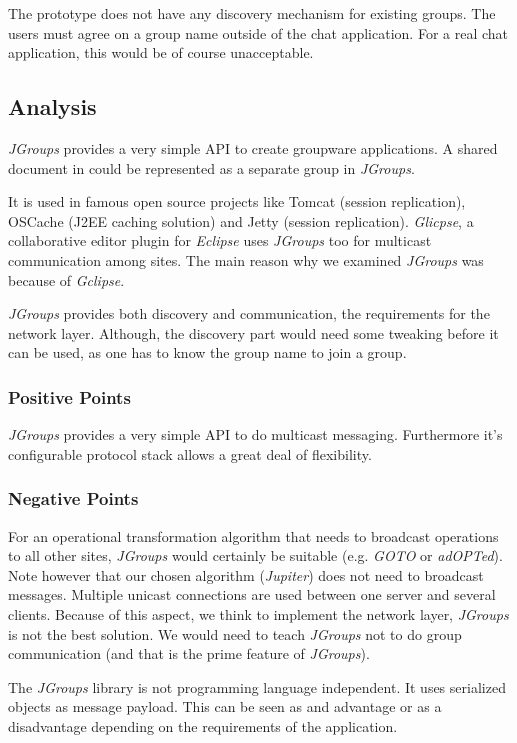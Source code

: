 The prototype does not have any discovery mechanism for existing groups. The users must agree on a group name outside of the chat application. For a real chat application, this would be of course unacceptable.


\subsection{Analysis}
\emph{JGroups} provides a very simple API to create groupware applications. A shared document in \ace could be represented as a separate group in \emph{JGroups}. 

It is used in famous open source projects like Tomcat (session replication), OSCache (J2EE caching solution) and Jetty (session replication). \emph{Glicpse}, a collaborative editor plugin for \emph{Eclipse} uses \emph{JGroups} too for multicast communication among sites. The main reason why we examined \emph{JGroups} was because of \emph{Gclipse}.

\emph{JGroups} provides both discovery and communication, the requirements for the network layer. Although, the discovery part would need some tweaking before it can be used, as one has to know the group name to join a group.

\subsubsection{Positive Points}
\emph{JGroups} provides a very simple API to do multicast messaging. Furthermore it's configurable protocol stack allows a great deal of flexibility.

\subsubsection{Negative Points}
For an operational transformation algorithm that needs to broadcast operations to all other sites, \emph{JGroups} would certainly be suitable (e.g. \emph{GOTO}  or \emph{adOPTed}). Note however that our chosen algorithm (\emph{Jupiter}) does not need to broadcast messages. Multiple unicast connections are used between one server and several clients. Because of this aspect, we think to implement the network layer, \emph{JGroups} is not the best solution. We would need to teach \emph{JGroups} not to do group communication (and that is the prime feature of \emph{JGroups}). 

The \emph{JGroups} library is not programming language independent. It uses serialized objects as message payload. This can be seen as and advantage or as a disadvantage depending on the requirements of the application.

